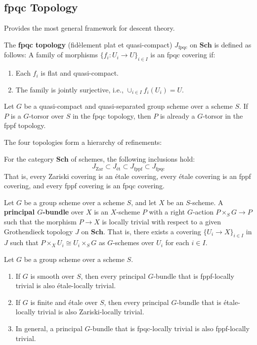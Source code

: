 \documentclass[12pt]{article}
\begin{document}
\subsection{fpqc Topology}
Provides the most general framework for descent theory.
\begin{definition}
    The \textbf{fpqc topology} (fidèlement plat et quasi-compact) $J_{\textrm{fpqc}}$ on $\mathbf{Sch}$ is defined as follows: A family of morphisms $\{f_i: U_i \to U\}_{i \in I}$ is an fpqc covering if:
    \begin{enumerate}
        \item Each $f_i$ is flat and quasi-compact.
        \item The family is jointly surjective, i.e., $\cup_{i \in I} f_i(U_i) = U$.
    \end{enumerate}
\end{definition}
\begin{proposition}
    Let $G$ be a quasi-compact and quasi-separated group scheme over a scheme $S$. If $P$ is a $G$-torsor over $S$ in the fpqc topology, then $P$ is already a $G$-torsor in the fppf topology.
\end{proposition}
The four topologies form a hierarchy of refinements:
\begin{theorem}
    For the category $\mathbf{Sch}$ of schemes, the following inclusions hold:
    \[ J_{\textrm{Zar}} \subset J_{\textrm{ét}} \subset J_{\textrm{fppf}} \subset J_{\textrm{fpqc}} \]
    That is, every Zariski covering is an étale covering, every étale covering is an fppf covering, and every fppf covering is an fpqc covering.
\end{theorem}


\begin{definition}
    Let $G$ be a group scheme over a scheme $S$, and let $X$ be an $S$-scheme. A \textbf{principal $G$-bundle} over $X$ is an $X$-scheme $P$ with a right $G$-action $P \times_S G \to P$ such that the morphism $P \to X$ is locally trivial with respect to a given Grothendieck topology $J$ on $\mathbf{Sch}$. That is, there exists a covering $\{U_i \to X\}_{i \in I}$ in $J$ such that $P \times_X U_i \cong U_i \times_S G$ as $G$-schemes over $U_i$ for each $i \in I$.
\end{definition}

\begin{proposition}
    Let $G$ be a group scheme over a scheme $S$.
    \begin{enumerate}
        \item If $G$ is smooth over $S$, then every principal $G$-bundle that is fppf-locally trivial is also étale-locally trivial.
        \item If $G$ is finite and étale over $S$, then every principal $G$-bundle that is étale-locally trivial is also Zariski-locally trivial.
        \item In general, a principal $G$-bundle that is fpqc-locally trivial is also fppf-locally trivial.
    \end{enumerate}
\end{proposition}
\end{document}

